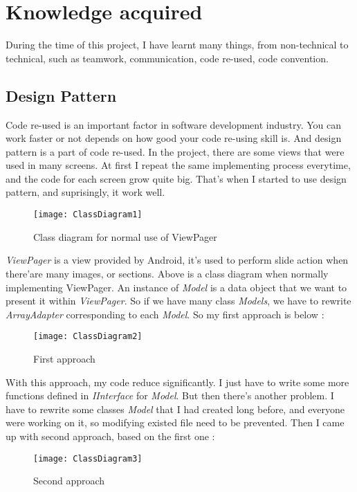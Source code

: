 \chapter{Knowledge acquired}

During the time of this project, I have learnt many things, from non-technical to technical, such as teamwork, communication, code re-used, code convention. 

\section{Design Pattern}

Code re-used is an important factor in software development industry. You can work faster or not depends on how good your code re-using skill is. And design pattern is a part of code re-used. In the project, there are some views that were used in many screens. At first I repeat the same implementing process everytime, and the code for each screen grow quite big. That's when I started to use design pattern, and suprisingly, it work well.


\begin{figure}[H]
\centering
\texttt{[image: ClassDiagram1]}
\caption{Class diagram for normal use of ViewPager}
\end{figure}

\textit{ViewPager} is a view provided by Android, it's used to perform slide action when there'are many images, or sections. Above is a class diagram when normally implementing ViewPager. An instance of \textit{Model} is a data object that we want to present it within \textit{ViewPager}. So if we have many class \textit{Models}, we have to rewrite \textit{ArrayAdapter} corresponding to each \textit{Model}. So my first approach is below :

\begin{figure}[H]
\centering
\texttt{[image: ClassDiagram2]}
\caption{First approach}
\end{figure}

With this approach, my code reduce significantly. I just have to write some more functions defined in \textit{IInterface} for \textit{Model}. But then there's another problem. I have to rewrite some classes \textit{Model} that I had created long before, and everyone were working on it, so modifying existed file need to be prevented. Then I came up with second approach, based on the first one :

\begin{figure}[H]
\centering
\texttt{[image: ClassDiagram3]}
\caption{Second approach}
\end{figure}

